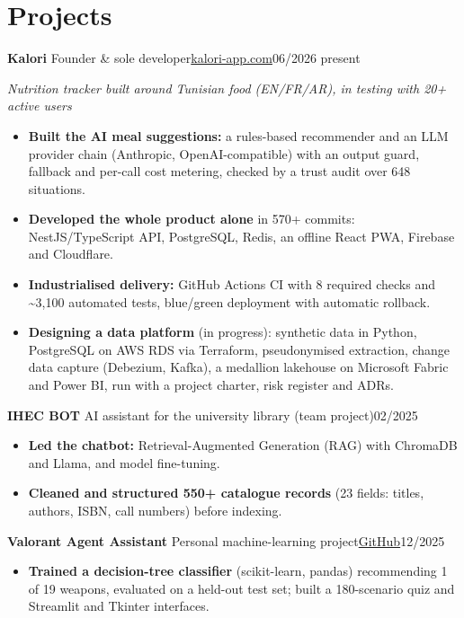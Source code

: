 \documentclass[10pt]{article}
\newcommand{\entry}[3]{\par\vspace{2pt}\textbf{#1}#2\hfill{\color{soft}#3}\par}
\newcommand{\sub}[1]{{\itshape\color{soft}#1\par}}
\newcommand{\sep}{\enspace\textperiodcentered\enspace}
\begin{document}
\section{Projects}
\entry{Kalori}{ \textendash{} Founder \& sole developer\sep \href{https://kalori-app.com}{kalori-app.com}}{06/2026 \textendash{} present}
\sub{Nutrition tracker built around Tunisian food (EN/FR/AR), in testing with 20+ active users}
\begin{itemize}
\item \textbf{Built the AI meal suggestions:} a rules-based recommender and an LLM provider chain (Anthropic, OpenAI-compatible) with an output guard, fallback and per-call cost metering, checked by a trust audit over 648 situations.
\item \textbf{Developed the whole product alone} in 570+ commits: NestJS/TypeScript API, PostgreSQL, Redis, an offline React PWA, Firebase and Cloudflare.
\item \textbf{Industrialised delivery:} GitHub Actions CI with 8 required checks and \textasciitilde{}3,100 automated tests, blue/green deployment with automatic rollback.
\item \textbf{Designing a data platform} (in progress): synthetic data in Python, PostgreSQL on AWS RDS via Terraform, pseudonymised extraction, change data capture (Debezium, Kafka), a medallion lakehouse on Microsoft Fabric and Power BI, run with a project charter, risk register and ADRs.
\end{itemize}
\entry{IHEC BOT}{ \textendash{} AI assistant for the university library (team project)}{02/2025}
\begin{itemize}
\item \textbf{Led the chatbot:} Retrieval-Augmented Generation (RAG) with ChromaDB and Llama, and model fine-tuning.
\item \textbf{Cleaned and structured 550+ catalogue records} (23 fields: titles, authors, ISBN, call numbers) before indexing.
\end{itemize}
\entry{Valorant Agent Assistant}{ \textendash{} Personal machine-learning project\sep \href{https://github.com/AzizGh69/ValorantAgentAssistant}{GitHub}}{12/2025}
\begin{itemize}
\item \textbf{Trained a decision-tree classifier} (scikit-learn, pandas) recommending 1 of 19 weapons, evaluated on a held-out test set; built a 180-scenario quiz and Streamlit and Tkinter interfaces.
\end{itemize}
\end{document}
